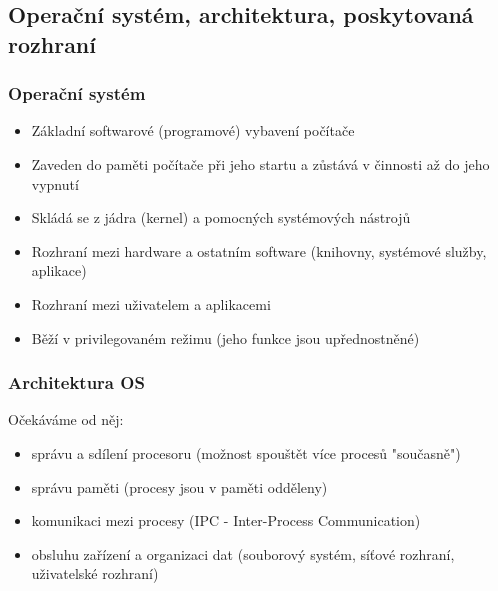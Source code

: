\documentclass[10pt,a4paper]{article}
\begin{document}
\subsection{Operační systém, architektura, poskytovaná rozhraní}

\subsubsection{Operační systém}
\begin{itemize}
	\item Základní softwarové (programové) vybavení počítače
	\item Zaveden do paměti počítače při jeho startu a zůstává v činnosti až do jeho vypnutí
	\item Skládá se z jádra (kernel) a pomocných systémových nástrojů
	\item Rozhraní mezi hardware a ostatním software (knihovny, systémové služby, aplikace)
	\item Rozhraní mezi uživatelem a aplikacemi
	\item Běží v privilegovaném režimu (jeho funkce jsou upřednostněné)
\end{itemize}

\subsubsection{Architektura OS}
Očekáváme od něj:
\begin{itemize}
	\item správu a sdílení procesoru (možnost spouštět více procesů "současně")
	\item správu paměti (procesy jsou v paměti odděleny)
	\item komunikaci mezi procesy (IPC - Inter-Process Communication)
	\item obsluhu zařízení a organizaci dat (souborový systém, síťové rozhraní, uživatelské rozhraní)
\end{itemize}
\end{document}
